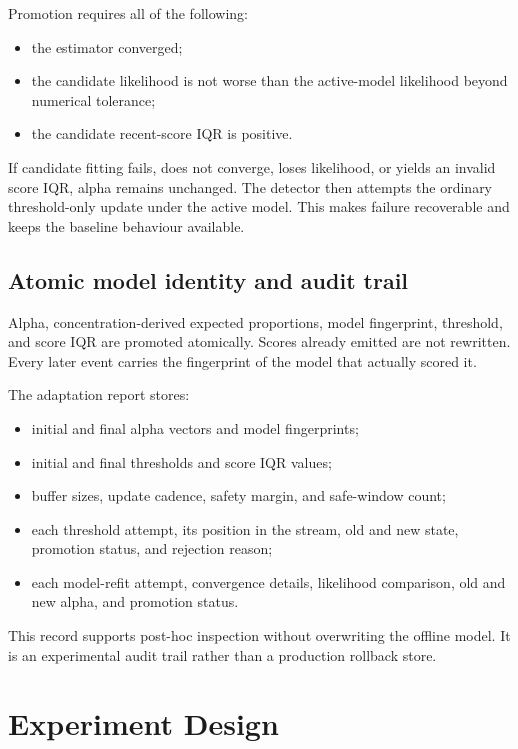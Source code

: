 \documentclass[11pt,a4paper]{article}
\begin{document}
Promotion requires all of the following:

\begin{itemize}
  \item the estimator converged;
  \item the candidate likelihood is not worse than the active-model likelihood
  beyond numerical tolerance;
  \item the candidate recent-score IQR is positive.
\end{itemize}

If candidate fitting fails, does not converge, loses likelihood, or yields an
invalid score IQR, alpha remains unchanged. The detector then attempts the
ordinary threshold-only update under the active model. This makes failure
recoverable and keeps the baseline behaviour available.

\subsection{Atomic model identity and audit trail}

Alpha, concentration-derived expected proportions, model fingerprint,
threshold, and score IQR are promoted atomically. Scores already emitted are
not rewritten. Every later event carries the fingerprint of the model that
actually scored it.

The adaptation report stores:

\begin{itemize}
  \item initial and final alpha vectors and model fingerprints;
  \item initial and final thresholds and score IQR values;
  \item buffer sizes, update cadence, safety margin, and safe-window count;
  \item each threshold attempt, its position in the stream, old and new state,
  promotion status, and rejection reason;
  \item each model-refit attempt, convergence details, likelihood comparison,
  old and new alpha, and promotion status.
\end{itemize}

This record supports post-hoc inspection without overwriting the offline model.
It is an experimental audit trail rather than a production rollback store.

\section{Experiment Design}
\end{document}

